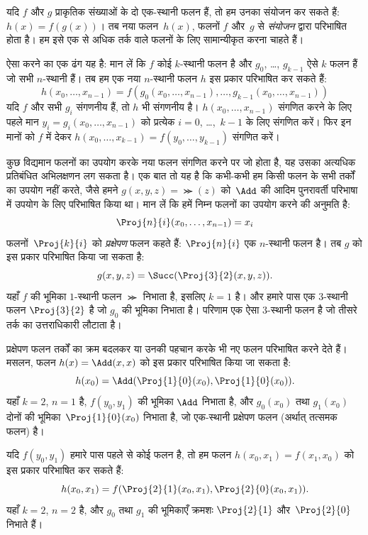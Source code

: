 \documentclass[../../../include/open-logic-section]{subfiles}
\begin{document}

यदि $f$ और $g$ प्राकृतिक संख्याओं के दो एक-स्थानी फलन हैं, तो हम उनका
संयोजन कर सकते हैं: $h(x) = f(g(x))$। तब नया फलन~$h(x)$, फलनों $f$
और~$g$ से \emph{संयोजन} द्वारा परिभाषित होता है। हम इसे एक से अधिक
तर्क वाले फलनों के लिए सामान्यीकृत करना चाहते हैं।

ऐसा करने का एक ढंग यह है: मान लें कि $f$ कोई $k$-स्थानी फलन है और
$g_0$, \dots, $g_{k-1}$ ऐसे $k$ फलन हैं जो सभी $n$-स्थानी हैं। तब हम
एक नया $n$-स्थानी फलन $h$ इस प्रकार परिभाषित कर सकते हैं:
\[
h(x_0, \dots, x_{n-1}) =
f(g_0(x_0, \dots, x_{n-1}), \dots, g_{k-1}(x_0, \dots, x_{n-1}))
\]
यदि $f$ और सभी $g_i$ संगणनीय हैं, तो $h$ भी संगणनीय है। $h(x_0,
\dots, x_{n-1})$ संगणित करने के लिए पहले मान $y_i = g_i(x_0, \dots,
x_{n-1})$ को प्रत्येक $i = 0$, \dots,~$k-1$ के लिए संगणित करें।
फिर इन मानों को $f$ में देकर
$h(x_0, \dots, x_{k-1}) = f(y_0, \dots, y_{k-1})$ संगणित करें।

कुछ विद्यमान फलनों का उपयोग करके नया फलन संगणित करने पर जो होता है, यह
उसका अत्यधिक प्रतिबंधित अभिलक्षणन लग सकता है। एक बात तो यह है कि कभी-कभी
हम किसी फलन के सभी तर्कों का उपयोग नहीं करते, जैसे हमने
$g(x, y, z) = \Succ(z)$ को~$\Add$ की आदिम पुनरावर्ती परिभाषा में उपयोग
के लिए परिभाषित किया था। मान लें कि हमें निम्न फलनों का उपयोग करने की अनुमति है:
\[
\Proj{n}{i}(x_0, \dots, x_{n-1}) = x_i
\]
फलनों~$\Proj{k}{i}$ को \emph{प्रक्षेपण} फलन कहते हैं:
$\Proj{n}{i}$ एक $n$-स्थानी फलन है। तब $g$ को इस प्रकार परिभाषित किया जा सकता है:
\[
g(x, y, z) = \Succ(\Proj{3}{2}(x, y, z)).
\]
यहाँ $f$ की भूमिका $1$-स्थानी फलन $\Succ$ निभाता है, इसलिए $k=1$ है।
और हमारे पास एक $3$-स्थानी फलन $\Proj{3}{2}$ है जो $g_0$ की भूमिका
निभाता है। परिणाम एक ऐसा $3$-स्थानी फलन है जो तीसरे तर्क का उत्तराधिकारी
लौटाता है।

प्रक्षेपण फलन तर्कों का क्रम बदलकर या उनकी पहचान करके भी नए फलन परिभाषित
करने देते हैं। मसलन, फलन $h(x)
= \Add(x, x)$ को इस प्रकार परिभाषित किया
जा सकता है:
\[
h(x_0) = \Add(\Proj{1}{0}(x_0),\Proj{1}{0}(x_0)).
\]
यहाँ $k=2$, $n=1$ है, $f(y_0,y_1)$ की भूमिका $\Add$ निभाता है, और
$g_0(x_0)$ तथा $g_1(x_0)$ दोनों की भूमिका~$\Proj{1}{0}(x_0)$ निभाता
है, जो एक-स्थानी प्रक्षेपण फलन (अर्थात् तत्समक फलन) है।

यदि $f(y_0, y_1)$ हमारे पास पहले से कोई फलन है, तो हम फलन
$h(x_0, x_1) = f(x_1, x_0)$ को इस प्रकार परिभाषित कर सकते हैं:
\[
h(x_0, x_1) = f(\Proj{2}{1}(x_0, x_1),\Proj{2}{0}(x_0, x_1)).
\]
यहाँ $k=2$, $n = 2$ है, और $g_0$ तथा $g_1$ की भूमिकाएँ क्रमशः
$\Proj{2}{1}$ और~$\Proj{2}{0}$ निभाते हैं।
\end{document}
